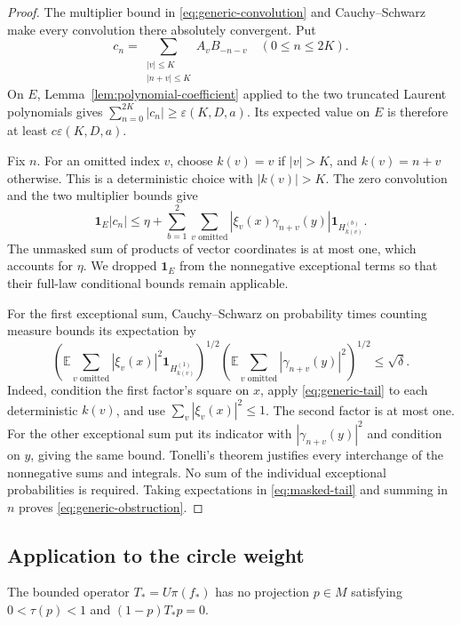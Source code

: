 \begin{proof}
The multiplier bound in \eqref{eq:generic-convolution} and
Cauchy--Schwarz make every convolution there absolutely convergent.
Put
\[
 c_n=\sum_{\substack{|v|\le K\\|n+v|\le K}}A_vB_{-n-v}
       \quad(0\le n\le2K).
\]
On $E$, Lemma~\ref{lem:polynomial-coefficient} applied to the two
truncated Laurent polynomials gives
$\sum_{n=0}^{2K}|c_n|\ge\varepsilon(K,D,a)$.  Its expected value on
$E$ is therefore at least $c\varepsilon(K,D,a)$.

Fix $n$.  For an omitted index $v$, choose $k(v)=v$ if $|v|>K$,
and $k(v)=n+v$ otherwise.  This is a deterministic choice with
$|k(v)|>K$.  The zero convolution and the two multiplier bounds give
\begin{equation}\label{eq:masked-tail}
 \mathbf1_E|c_n|\le\eta+
 \sum_{b=1}^2\sum_{v\text{ omitted}}
 |\xi_v(x)\gamma_{n+v}(y)|\mathbf1_{H_{k(v)}^{(b)}}.
\end{equation}
The unmasked sum of products of vector coordinates is at most one,
which accounts for $\eta$.  We dropped $\mathbf1_E$ from the
nonnegative exceptional terms so that their full-law conditional
bounds remain applicable.

For the first exceptional sum, Cauchy--Schwarz on probability times
counting measure bounds its expectation by
\[
 \left(\mathbb E\sum_{v\text{ omitted}}
       |\xi_v(x)|^2\mathbf1_{H_{k(v)}^{(1)}}\right)^{1/2}
 \left(\mathbb E\sum_{v\text{ omitted}}
       |\gamma_{n+v}(y)|^2\right)^{1/2}
 \le\sqrt\delta.
\]
Indeed, condition the first factor's square on $x$, apply
\eqref{eq:generic-tail} to each deterministic $k(v)$, and use
$\sum_v|\xi_v(x)|^2\le1$.  The second factor is at most one.  For
the other exceptional sum put its indicator with
$|\gamma_{n+v}(y)|^2$ and condition on $y$, giving the same bound.
Tonelli's theorem justifies every interchange of the nonnegative sums
and integrals.  No sum of the individual exceptional probabilities is
required.  Taking expectations in \eqref{eq:masked-tail} and summing
in $n$ proves \eqref{eq:generic-obstruction}.
\end{proof}

\subsection{Application to the circle weight}

\begin{theorem}\label{thm:measurable}
The bounded operator $T_*=U\pi(f_*)$ has no projection $p\in M$ satisfying
$0<\tau(p)<1$ and $(1-p)T_*p=0$.
\end{theorem}


